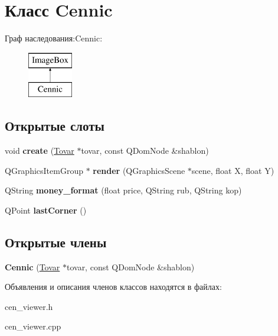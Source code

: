 \hypertarget{class_cennic}{\section{Класс \-Cennic}
\label{class_cennic}
}
Граф наследования\-:\-Cennic\-:\begin{figure}[H]
\begin{center}
\leavevmode
\includegraphics[height=2.000000cm]{class_cennic}
\end{center}
\end{figure}
\subsection*{Открытые слоты}
\begin{DoxyCompactItemize}
\item 
\hypertarget{class_cennic_a797c5bf701650b5e83295cc1311ed1f4}{void {\bfseries create} (\hyperlink{struct_tovar}{\-Tovar} $\ast$tovar, const \-Q\-Dom\-Node \&shablon)}\label{class_cennic_a797c5bf701650b5e83295cc1311ed1f4}

\item 
\hypertarget{class_cennic_ab98aa98ef7968950f047fa91c6909764}{\-Q\-Graphics\-Item\-Group $\ast$ {\bfseries render} (\-Q\-Graphics\-Scene $\ast$scene, float \-X, float \-Y)}\label{class_cennic_ab98aa98ef7968950f047fa91c6909764}

\item 
\hypertarget{class_cennic_aa3769c0df42f8e958bcd53579d652f7f}{\-Q\-String {\bfseries money\-\_\-format} (float price, \-Q\-String rub, \-Q\-String kop)}\label{class_cennic_aa3769c0df42f8e958bcd53579d652f7f}

\item 
\hypertarget{class_cennic_ad030817bd64f5d47543c801b7b50c855}{\-Q\-Point {\bfseries last\-Corner} ()}\label{class_cennic_ad030817bd64f5d47543c801b7b50c855}

\end{DoxyCompactItemize}
\subsection*{Открытые члены}
\begin{DoxyCompactItemize}
\item 
\hypertarget{class_cennic_ab20ea02fc8ade7511109546d00123d14}{{\bfseries \-Cennic} (\hyperlink{struct_tovar}{\-Tovar} $\ast$tovar, const \-Q\-Dom\-Node \&shablon)}\label{class_cennic_ab20ea02fc8ade7511109546d00123d14}

\end{DoxyCompactItemize}


Объявления и описания членов классов находятся в файлах\-:\begin{DoxyCompactItemize}
\item 
cen\-\_\-viewer.\-h\item 
cen\-\_\-viewer.\-cpp\end{DoxyCompactItemize}
